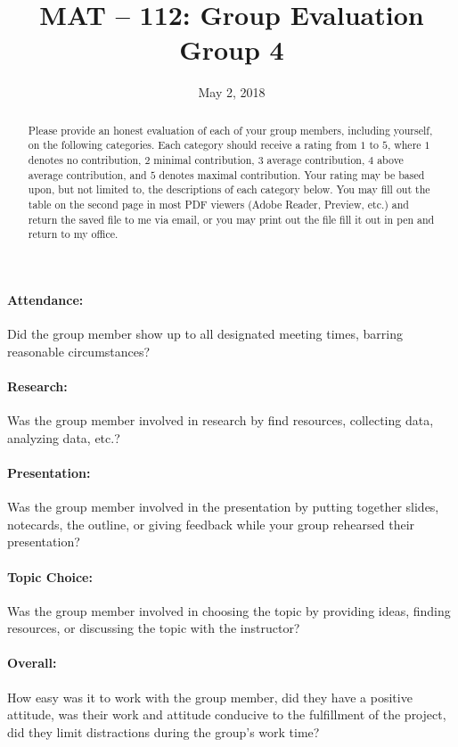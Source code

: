\documentclass{article}
\title{MAT -- 112: Group Evaluation\\
\large{Group 4}}
\date{May 2, 2018}
\begin{document}
\maketitle

\begin{abstract}
Please provide an honest evaluation of each of your group members, including yourself, on the following categories. Each category should receive a rating from $1$ to $5$, where $1$ denotes no contribution, $2$ minimal contribution, $3$ average contribution, $4$ above average contribution, and $5$ denotes maximal contribution.  Your rating may be based upon, but not limited to, the descriptions of each category below. You may fill out the table on the second page in most PDF viewers (Adobe Reader, Preview, etc.) and return the saved file to me via email, or you may print out the file fill it out in pen and return to my office. 
\end{abstract}

\paragraph*{Attendance:} Did the group member show up to all designated meeting times, barring reasonable circumstances?
\paragraph*{Research:} Was the group member involved in research by find resources, collecting data, analyzing data, etc.?
\paragraph*{Presentation:} Was the group member involved in the presentation by putting together slides, notecards, the outline, or giving feedback while your group rehearsed their presentation?
\paragraph*{Topic Choice:} Was the group member involved in choosing the topic by providing ideas, finding resources, or discussing the topic with the instructor?
\paragraph*{Overall:} How easy was it to work with the group member, did they have a positive attitude, was their work and attitude conducive to the fulfillment of the project, did they limit distractions during the group's work time?
\end{document}
